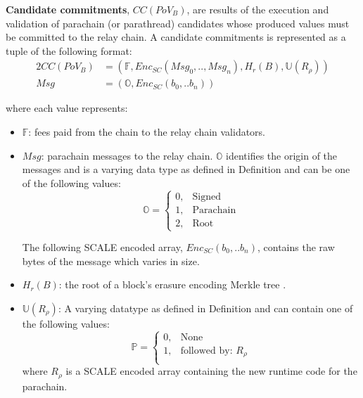 \begin{definition}
  \label{defn-candidate-commitments}
  \textbf{Candidate commitments}, $CC(PoV_B)$, are results of the execution and validation of
  parachain (or parathread) candidates whose produced values must be committed
  to the relay chain. A candidate commitments is represented as a tuple of the following format:
  \begin{alignat*}{2}
    CC(PoV_B) &= (\mathbb{F}, Enc_{SC}(Msg_0, .., Msg_n), H_r(B), \mathbb{U}(R_\rho)) \\
    Msg &= (\mathbb{O}, Enc_{SC}(b_0,.. b_n))
  \end{alignat*}

  where each value represents:
  \begin{itemize}
    \item $\mathbb{F}$: fees paid from the chain to the relay chain validators.
    \item $Msg$: parachain messages to the relay chain. $\mathbb{O}$ identifies
    the origin of the messages and is a varying data type as defined in
    Definition  and can be one of the following values:
    \begin{equation*}
      \mathbb{O} =
      \begin{cases}
        0, & \text{Signed} \\
        1, & \text{Parachain} \\
        2, & \text{Root}
      \end{cases}
    \end{equation*}

    The following SCALE encoded array, $Enc_{SC}(b_0,.. b_n)$, contains the
    raw bytes of the message which varies in size.
    \item $H_r(B)$: the root of a block's erasure encoding Merkle tree
    .
    \item $\mathbb{U}(R_\rho)$: A varying datatype as defined in Definition
     and can contain one of the following values:
    \begin{equation*}
      \mathbb{P} =
      \begin{cases}
        0, & \text{None} \\
        1, & \text{followed by: } R_\rho\\
      \end{cases}
    \end{equation*}
    where $R_\rho$ is a SCALE encoded array containing the new runtime code for
    the parachain. 
  \end{itemize}
  
\end{definition}

